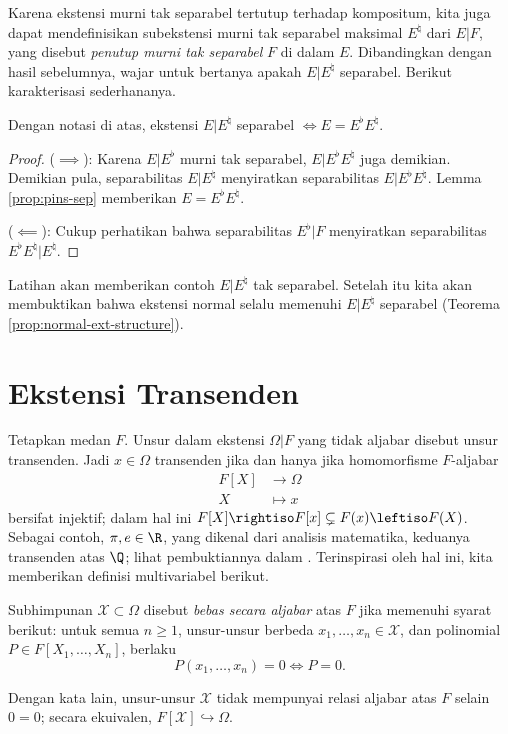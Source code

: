 Karena ekstensi murni tak separabel tertutup terhadap kompositum, kita juga dapat mendefinisikan subekstensi murni tak separabel maksimal $E^\natural$ dari $E|F$, yang disebut \emph{penutup murni tak separabel} $F$ di dalam $E$. Dibandingkan dengan hasil sebelumnya, wajar untuk bertanya apakah $E|E^\natural$ separabel. Berikut karakterisasi sederhananya.
\begin{proposition}\label{prop:pins-compositum}
	Dengan notasi di atas, ekstensi $E|E^\natural$ separabel $\iff E = E^\flat E^\natural$.
\end{proposition}
\begin{proof}
	($\implies$): Karena $E|E^\flat$ murni tak separabel, $E | E^\flat E^\natural$ juga demikian. Demikian pula, separabilitas $E|E^\natural$ menyiratkan separabilitas $E | E^\flat E^\natural$. Lemma \ref{prop:pins-sep} memberikan $E = E^\flat E^\natural$.
	
	($\impliedby$): Cukup perhatikan bahwa separabilitas $E^\flat|F$ menyiratkan separabilitas $E^\flat E^\natural | E^\natural$.
\end{proof}
Latihan akan memberikan contoh $E|E^\natural$ tak separabel. Setelah itu kita akan membuktikan bahwa ekstensi normal selalu memenuhi $E|E^\natural$ separabel (Teorema \ref{prop:normal-ext-structure}).

\section{Ekstensi Transenden}
Tetapkan medan $F$. Unsur dalam ekstensi $\Omega|F$ yang tidak aljabar disebut unsur transenden. Jadi $x \in \Omega$ transenden jika dan hanya jika homomorfisme $F$-aljabar
\begin{align*}
	F[X] & \longrightarrow \Omega \\
	X & \longmapsto x
\end{align*}
bersifat injektif; dalam hal ini $F[X] \rightiso F[x] \subsetneq F(x) \leftiso F(X)$. Sebagai contoh, $\pi, e \in \R$, yang dikenal dari analisis matematika, keduanya transenden atas $\Q$; lihat pembuktiannya dalam \cite[\S 7]{ZhP}. Terinspirasi oleh hal ini, kita memberikan definisi multivariabel berikut.

\begin{definition}\label{def:alg-indep}
	Subhimpunan $\mathcal{X} \subset \Omega$ disebut \emph{bebas secara aljabar} atas $F$ jika memenuhi syarat berikut: untuk semua $n \geq 1$, unsur-unsur berbeda $x_1, \ldots, x_n \in \mathcal{X}$, dan polinomial $P \in F[X_1, \ldots, X_n]$, berlaku
	\[ P(x_1, \ldots, x_n)=0 \iff P=0. \]
\end{definition}
Dengan kata lain, unsur-unsur $\mathcal{X}$ tidak mempunyai relasi aljabar atas $F$ selain $0=0$; secara ekuivalen, $F[\mathcal{X}] \hookrightarrow \Omega$.

